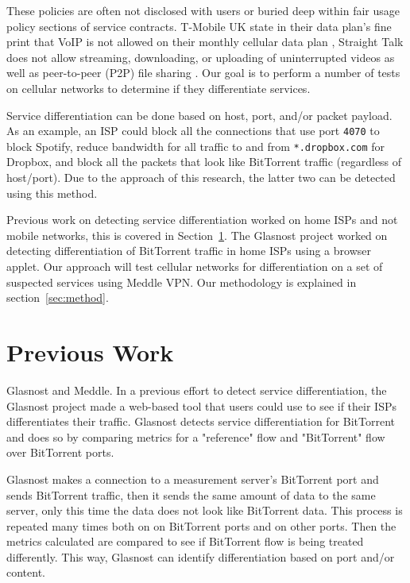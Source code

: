 \documentclass[letterpaper]{sig-alternate-10pt}
\begin{document}
These policies are often not disclosed with users or buried deep within fair usage policy sections of service contracts. T-Mobile UK state in their data plan's fine print that VoIP is not allowed on their monthly cellular data plan \cite{tmobuk}, Straight Talk does not allow streaming, downloading, or uploading of uninterrupted videos as well as peer-to-peer (P2P) file sharing \cite{straighttalk}. Our goal is to perform a number of tests on cellular networks to determine if they differentiate services.

Service differentiation can be done based on host, port, and/or packet payload. As an example, an ISP could block all the connections that use port \texttt{4070} to block Spotify, reduce bandwidth for all traffic to and from \texttt{*.dropbox.com} for Dropbox, and block all the packets that look like BitTorrent traffic (regardless of host/port). Due to the approach of this research, the latter two can be detected using this method.

Previous work on detecting service differentiation worked on home ISPs and not mobile networks, this is covered in Section~\ref{sec:prevwork}. The Glasnost project worked on detecting differentiation of BitTorrent traffic in home ISPs using a browser applet. Our approach will test cellular networks for differentiation on a set of suspected services using Meddle VPN. Our methodology is explained in section~\ref{sec:method}.

\section{Previous Work}
\label{sec:prevwork}

Glasnost and Meddle.
In a previous effort to detect service differentiation, the Glasnost project made a web-based tool that users could use to see if their ISPs differentiates their traffic. Glasnost detects service differentiation for BitTorrent and does so by comparing metrics for a "reference" flow and "BitTorrent" flow over BitTorrent ports.

Glasnost makes a connection to a measurement server's BitTorrent port and sends BitTorrent traffic, then it sends the same amount of data to the same server, only this time the data does not look like BitTorrent data. This process is repeated many times both on on BitTorrent ports and on other ports. Then the metrics calculated are compared to see if BitTorrent flow is being treated differently. This way, Glasnost can identify differentiation based on port and/or content.
\end{document}
